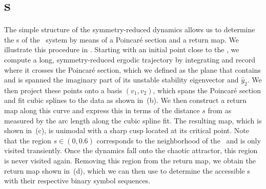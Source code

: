 \section{\Po s}
\label{s:numerics}

The simple structure of the symmetry-reduced dynamics allows us to
determine the \rpo s of the \twomode\ system by means of a Poincar\'e
section and a return map. We illustrate this procedure in
. Starting with an initial point close to the
\REQV{}{}, we compute a long, symmetry-reduced ergodic trajectory by integrating
 and record where it crosses the Poincar\'e section, which we
defined as the plane that contains \REQV{}{} and is spanned the imaginary part of its unstable stability
eigenvector and $\hat{y}_2$.
We then project these points onto a basis $(v_1, v_2)$, which
spans the Poincar\'e section and fit cubic splines to the data as shown in \,(b).
We then construct a return map along this curve and express this in terms of the distance $s$ from \REQV{}{}
as measured by the arc length along the cubic spline fit. The resulting map, which is shown in
\,(c), is unimodal with a sharp cusp located at its critical point.
Note that the region $s \in (0, 0.6)$ corresponds to
the neighborhood of the \reqv\  and is only visited transiently. Once the dynamics fall onto the chaotic
attractor, this region is never visited again. Removing this region from the return map, we
obtain the return map shown in \,(d), which we can then use to determine the
accessible \rpo s  with their respective binary symbol sequences.

